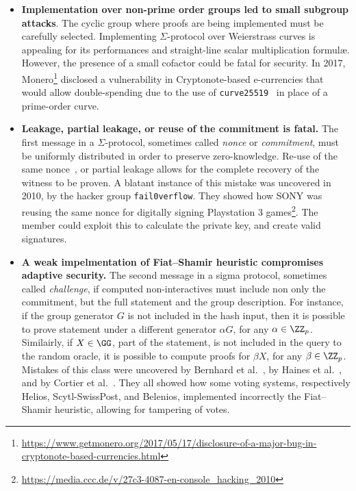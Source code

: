 \documentclass[runningheads]{llncs}
\begin{document}
\begin{itemize}
  \item \textbf{Implementation over non-prime order groups led to small subgroup attacks}. The cyclic group where proofs are being implemented must be carefully selected. Implementing $\Sigma$-protocol over Weierstrass curves is appealing for its performances and straight-line scalar multiplication formul\ae.
   However, the presence of a small cofactor could be fatal for security.
In 2017, Monero\footnote{\url{https://www.getmonero.org/2017/05/17/disclosure-of-a-major-bug-in-cryptonote-based-currencies.html}} disclosed a vulnerability in Cryptonote-based e-currencies that would allow double-spending
due to the use of \verb|curve25519|~\cite{PKC:Bernstein06} in place of a prime-order curve.
  \item \textbf{Leakage, partial leakage, or reuse of the commitment is fatal.}
  The first message in a  $\Sigma$-protocol, sometimes called \emph{nonce} or \emph{commitment}, must be uniformly distributed in order to preserve zero-knowledge. Re-use of the same nonce~\cite{XX}, or partial leakage allows for the complete recovery of the witness to be proven.
  A blatant instance of this mistake was uncovered in 2010, by the hacker group \texttt{fail0verflow}. They showed how SONY was reusing the same nonce for digitally signing Playstation 3 games\footnote{\url{https://media.ccc.de/v/27c3-4087-en-console_hacking_2010}}.  The member could exploit this to calculate the private key, and create valid signatures.

  \item \textbf{A weak impelmentation of Fiat--Shamir heuristic compromises adaptive security.} The second message in a sigma protocol, sometimes called \emph{challenge}, if computed non-interactives must include non only the commitment, but the full statement and the group description. For instance, if the group generator $G$ is not included in the hash input, then it is possible to prove statement under a different generator $\alpha G$, for any $\alpha \in \ZZ_p$.
  Similairly, if $X \in \GG$, part of the statement, is not included in the query to the random oracle, it is possible to compute proofs for $\beta X$, for any $\beta \in \ZZ_p$.
  Mistakes of this class were uncovered by Bernhard et al.~\cite{AC:BerPerWar12}, by Haines et al.~\cite{SP:HLPT20}, and by Cortier et al.~\cite{cortier2020}.
  They all showed how some voting systems, respectively Helios,  Scytl-SwissPost, and Belenios,
  implemented incorrectly the Fiat--Shamir heuristic, allowing for tampering of votes.

\end{itemize}
\end{document}
